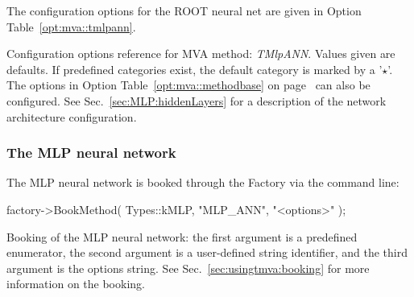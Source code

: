 The configuration options for the ROOT neural net are given in Option Table~\ref{opt:mva::tmlpann}. 
\begin{option}[t]

\caption[.]{\optionCaptionSize 
     Configuration options reference for MVA method: {\em TMlpANN}.
     Values given are defaults. If predefined categories exist, the default category 
     is marked by a '$\star$'. The options in Option Table~\ref{opt:mva::methodbase} on 
     page~\pageref{opt:mva::methodbase} can also be configured.     
     See Sec.~\ref{sec:MLP:hiddenLayers} for a description of the 
     network architecture configuration.
}
\label{opt:mva::tmlpann}
\end{option}

\subsubsection*{The MLP neural network }

The MLP neural network is booked through the Factory via the command line:
\begin{codeexample}
\begin{tmvacode}
factory->BookMethod( Types::kMLP, "MLP_ANN", "<options>" );
\end{tmvacode}
\caption[.]{\codeexampleCaptionSize Booking of the MLP neural network: the first argument 
            is a predefined enumerator, the second argument is a user-defined string 
            identifier, and the third argument is the options string.
            See Sec.~\ref{sec:usingtmva:booking} for more information on the booking.}
\end{codeexample}


